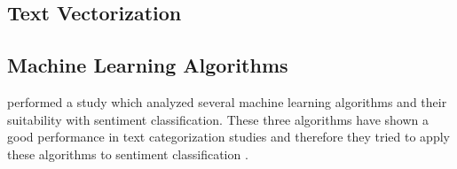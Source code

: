 
\subsection{Text Vectorization}
\label{ss:background-optionmining-textvectorization}




\subsection{Machine Learning Algorithms}
\label{ss:background-optionmining-machinelearningalgorithms}

\citeauthor{Pang2002} performed a study which analyzed several machine learning algorithms and their suitability with sentiment classification.
These three algorithms have shown a good performance in text categorization studies and therefore they tried to apply these algorithms to sentiment classification \cite{Pang2002}.

